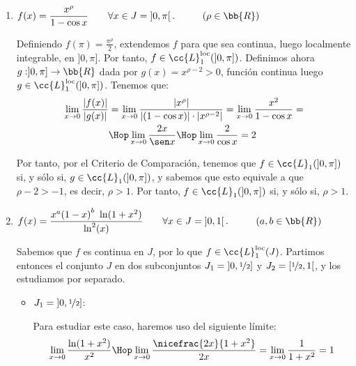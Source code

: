 \begin{ejercicio}
\begin{enumerate}
        Por tanto, $f\in \cc{L}_1(J)$ en todo caso, independientemente del valor de $n\in \bb{N}$.

        \item $f(x)=\dfrac{x^\rho}{1-\cos x} \qquad \forall x\in J=\left]0,\pi\right[.\hspace{1cm}(\rho\in \bb{R})$
        
        Definiendo $f(\pi) = \frac{\pi^\rho}{2}$, extendemos $f$ para que sea continua,
        luego localmente integrable, en $]0,\pi]$. Por tanto, $f\in \cc{L}_1^{\text{loc}}(]0,\pi])$.
        Definimos ahora $g:]0,\pi]\to \bb{R}$ dada por $g(x)=x^{\rho-2}>0$, función continua luego $g\in \cc{L}_1^{\text{loc}}(]0,\pi])$.
        Tenemos que:
        \begin{align*}
            \lim_{x\to 0} \dfrac{|f(x)|}{|g(x)|}
            &= \lim_{x\to 0} \dfrac{|x^\rho|}{|(1-\cos x)|\cdot |x^{\rho-2}|}
            = \lim_{x\to 0} \dfrac{x^2}{1-\cos x}
            =\\& \Hop \lim_{x\to 0} \dfrac{2x}{\sen x}
            \Hop \lim_{x\to 0} \dfrac{2}{\cos x} = 2
        \end{align*}

        Por tanto, por el Criterio de Comparación, tenemos que $f\in \cc{L}_1(]0,\pi])$ si, y sólo si, $g\in \cc{L}_1(]0,\pi])$, y sabemos que esto equivale a que $\rho-2>-1$, es decir, $\rho>1$.
        Por tanto, $f\in \cc{L}_1(]0,\pi])$ si, y sólo si, $\rho>1$.

        \item $f(x)=\dfrac{x^a{(1-x)}^b~\ln(1+x^2)}{\ln^2(x)} \qquad \forall x\in J=\left]0,1\right[.\hspace{1cm}(a,b\in \bb{R})$
        
        Sabemos que $f$ es continua en $J$, por lo que $f\in \cc{L}_1^{\text{loc}}(J)$.
        Partimos entonces el conjunto $J$ en dos subconjuntos $J_1=\left]0,\nicefrac{1}{2}\right]$ y $J_2=\left[\nicefrac{1}{2},1\right[$, y los estudiamos por separado.
        \begin{itemize}
            \item \ul{$J_1=\left]0,\nicefrac{1}{2}\right]$}:
            
            Para estudiar este caso, haremos uso del siguiente límite:
            \begin{equation*}
                \lim_{x\to 0} \dfrac{\ln(1+x^2)}{x^2}
                \Hop
                \lim_{x\to 0} \dfrac{\nicefrac{2x}{1+x^2}}{2x}
                = \lim_{x\to 0} \dfrac{1}{1+x^2} = 1
            \end{equation*}


\end{itemize}
\end{enumerate}
\end{ejercicio}
